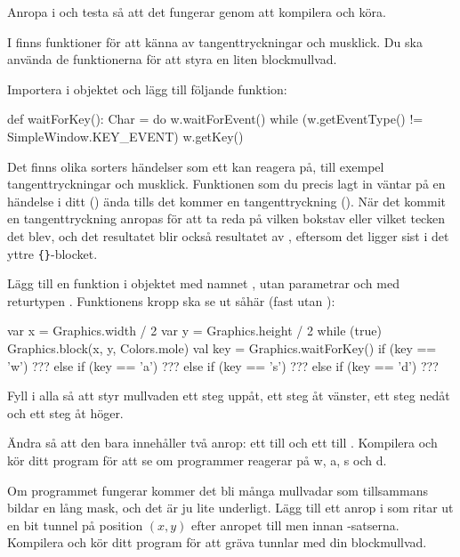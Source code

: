 \Subtask
Anropa  i  och testa så att det fungerar genom att kompilera och köra.

\Task
I  finns funktioner för att känna av tangenttryckningar och musklick.
Du ska använda de funktionerna för att styra en liten blockmullvad.

\Subtask
Importera  i objektet  och lägg till följande funktion:
\begin{Code}
def waitForKey(): Char = {
	do {
		w.waitForEvent()
	} while (w.getEventType() != SimpleWindow.KEY_EVENT)
	w.getKey()
}
\end{Code}
Det finns olika sorters händelser som ett  kan reagera på, till exempel tangenttryckningar och musklick.
Funktionen som du precis lagt in väntar på en händelse i ditt  () ända tills det kommer en tangenttryckning ().
När det kommit en tangenttryckning anropas  för att ta reda på vilken bokstav eller vilket tecken det blev, och det resultatet blir också resultatet av , eftersom det ligger sist i det yttre \texttt{\{\}}-blocket.

\Subtask
Lägg till en funktion i objektet  med namnet , utan parametrar och med returtypen .
Funktionens kropp ska se ut såhär (fast utan ):
\begin{Code}
{
  var x = Graphics.width / 2
  var y = Graphics.height / 2
  while (true) {
    Graphics.block(x, y, Colors.mole)
    val key = Graphics.waitForKey()
    if (key == 'w') ???
    else if (key == 'a') ???
    else if (key == 's') ???
    else if (key == 'd') ???
  }
}
\end{Code}
Fyll i alla  så att  styr mullvaden ett steg uppåt,  ett steg åt vänster,  ett steg nedåt och  ett steg åt höger.

\Subtask
Ändra  så att den bara innehåller två anrop: ett till  och ett till .
Kompilera och kör ditt program för att se om programmer reagerar på w, a, s och d.

\Subtask
Om programmet fungerar kommer det bli många mullvadar som tillsammans bildar en lång mask, och det är ju lite underligt.
Lägg till ett anrop i  som ritar ut en bit tunnel på position $(x, y)$ efter anropet till  men innan -satserna.
Kompilera och kör ditt program för att gräva tunnlar med din blockmullvad.

